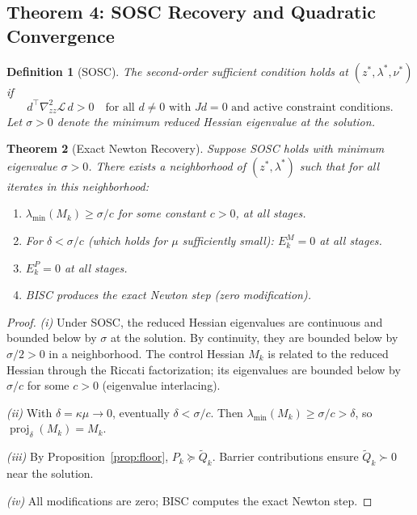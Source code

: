 \documentclass[11pt]{article}
\newtheorem{theorem}{Theorem}
\newtheorem{definition}[theorem]{Definition}
\DeclareMathOperator{\proj}{proj}
\begin{document}
\subsection{Theorem 4: SOSC Recovery and Quadratic Convergence}

\begin{definition}[SOSC]
The second-order sufficient condition holds at $(z^*, \lambda^*, \nu^*)$ if
\begin{equation}
  d^\top \nabla^2_{zz} \mathcal{L}\, d > 0 \quad
  \text{for all } d \ne 0 \text{ with } Jd = 0 \text{ and active constraint conditions}.
\end{equation}
Let $\sigma > 0$ denote the minimum reduced Hessian eigenvalue at the solution.
\end{definition}

\begin{theorem}[Exact Newton Recovery]\label{thm:sosc}
Suppose SOSC holds with minimum eigenvalue $\sigma > 0$. There exists a
neighborhood of $(z^*, \lambda^*)$ such that for all iterates in this neighborhood:
\begin{enumerate}
  \item[(i)] $\lambda_{\min}(M_k) \ge \sigma / c$ for some constant $c > 0$, at all stages.
  \item[(ii)] For $\delta < \sigma / c$ (which holds for $\mu$ sufficiently small):
              $E_k^M = 0$ at all stages.
  \item[(iii)] $E_k^P = 0$ at all stages.
  \item[(iv)] BISC produces the \emph{exact} Newton step (zero modification).
\end{enumerate}
\end{theorem}

\begin{proof}
\emph{(i)} Under SOSC, the reduced Hessian eigenvalues are continuous and bounded
below by $\sigma$ at the solution. By continuity, they are bounded below by
$\sigma/2 > 0$ in a neighborhood. The control Hessian $M_k$ is related to the
reduced Hessian through the Riccati factorization; its eigenvalues are bounded
below by $\sigma/c$ for some $c > 0$ (eigenvalue interlacing).

\emph{(ii)} With $\delta = \kappa \mu \to 0$, eventually $\delta < \sigma/c$.
Then $\lambda_{\min}(M_k) \ge \sigma/c > \delta$, so $\proj_\delta(M_k) = M_k$.

\emph{(iii)} By Proposition~\ref{prop:floor}, $P_k \succeq \tilde{Q}_k$.
Barrier contributions ensure $\tilde{Q}_k \succ 0$ near the solution.

\emph{(iv)} All modifications are zero; BISC computes the exact Newton step.
\end{proof}
\end{document}
